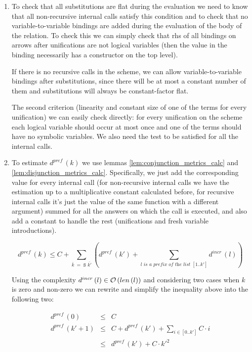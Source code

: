 \begin{enumerate}
\item To check that all substitutions are flat during the evaluation we need to know that all non-recursive internal calls satisfy this condition and to check that no variable-to-variable bindings are added during the evaluation of the body of the relation. To check this we can simply check that rhs of all bindings on arrows after unifications are not logical variables (then the value in the binding
necessarily has a constructor on the top level).

If there is no recursive calls in the scheme, we can allow variable-to-variable bindings after substitutions, since there will be at most a constant number of them and substitutions will always be constant-factor flat.

The second criterion (linearity and constant size of one of the terms for every unification) we can easily check directly: for every unification on the scheme each logical variable should occur at most once and one of the terms should have no symbolic variables. We also need the test to be satisfied for all the internal calls.

\item To estimate $d^{pref}\,(k)$ we use lemmas \ref{lem:conjunction_metrics_calc} and \ref{lem:disjunction_metrics_calc}. Specifically, we just add the corresponding value for every internal call
  (for non-recursive internal calls we have the estimation up to a multiplicative constant calculated before, for recursive internal calls it's just the value of the same function with a
  different argument) summed for all the answers on which the call is executed, and also add a constant to handle the rest (unifications and fresh variable introductions).

\[ d^{pref}\,(k) \le C + \sum_{\overline{k} \;=\; \texttt{S $\overline{k'}$}} (d^{pref}\,(k') + \sum_{\textit{$l$ is a prefix of the list $[1..k']$}} d^{incr}\,(l)) \]

Using the complexity $d^{incr}\,(l) \in \mathcal{O}\,(len\,(l))$ and considering two cases when $k$ is zero and non-zero we can rewrite and simplify the inequality above into the following two:

\[
\begin{array}{lcl}
d^{pref}\,(0) &\le& C \\
d^{pref}\,(k' + 1) &\le& C + d^{pref}\,(k') + \sum_{i \in [0..k']} C \cdot i \\
            &\le& d^{pref}\,(k') + C \cdot k'^2 
\end{array} \]


\end{enumerate}

